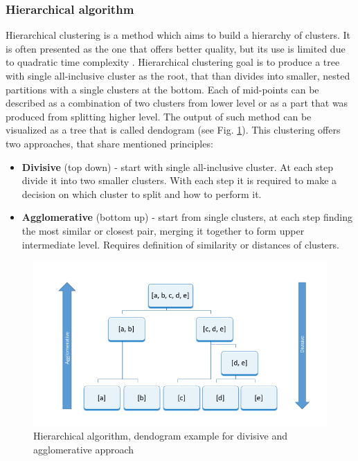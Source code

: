 	\subsubsection{Hierarchical algorithm}
	Hierarchical clustering is a method which aims to build a hierarchy of clusters. It is often presented as the one that offers better quality, but its use is limited due to quadratic time complexity \cite{k_means}. Hierarchical clustering goal is to produce a tree with single all-inclusive cluster as the root, that than divides into smaller, nested partitions with a single clusters at the bottom. Each of mid-points can be described as a combination of two clusters from lower level or as a part that was produced from splitting higher level. The output of such method can be visualized as a tree that is called dendogram (see Fig. \ref{hierarchical_dendogram}). This clustering offers two approaches, that share mentioned principles:
	
	\begin{itemize}
	\item \textbf{Divisive} (top down) - start with single all-inclusive cluster. At each step divide it into two smaller clusters. With each step it is required to make a decision on which cluster to split and how to perform it.
	\item \textbf{Agglomerative} (bottom up) - start from single clusters, at each step finding the most similar or closest pair, merging it together to form upper intermediate level. Requires definition of similarity or distances of clusters.
	\end{itemize}
	
	\begin{figure}[H]
	\begin{center}
	\includegraphics[width=1.0\linewidth]{images/hierarchical.png}
	\caption{Hierarchical algorithm, dendogram example for divisive and agglomerative approach}
	\label{hierarchical_dendogram}
	\end{center}
	\end{figure}

